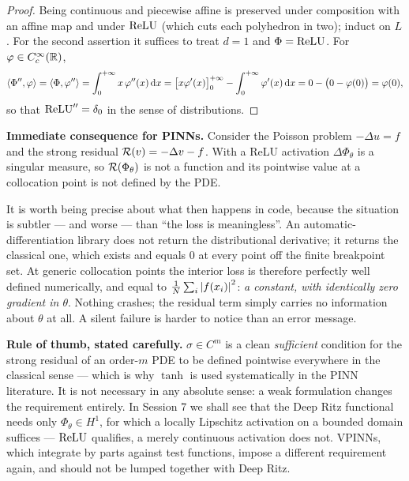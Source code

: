 \documentclass[11pt,a4paper]{article}
\begin{document}
\begin{proof}
Being continuous and piecewise affine is preserved under composition with an affine map and under
$\operatorname{ReLU}$ (which cuts each polyhedron in two); induct on $L$. For the second assertion it suffices to
treat $d = 1$ and $\Phi = \operatorname{ReLU}$. For $\varphi \in C^\infty_c(\mathbb{R})$,
\[
\langle \Phi'' , \varphi \rangle = \langle \Phi , \varphi'' \rangle = \int_0^{+\infty} x\, \varphi''(x)\,\mathrm{d} x
= \big[ x\varphi'(x)\big]_0^{+\infty} - \int_0^{+\infty}\varphi'(x)\,\mathrm{d} x
= 0 - \big(0 - \varphi(0)\big) = \varphi(0),
\]
so that $\operatorname{ReLU}'' = \delta_0$ in the sense of distributions.
\end{proof}

\begin{keybox}
\textbf{Immediate consequence for PINNs.} Consider the Poisson problem $-\Delta u = f$ and the
strong residual $\mathcal{R}(v) = -\Delta v - f$. With a ReLU activation $\Delta \Phi_\theta$ is a singular
measure, so $\mathcal{R}(\Phi_\theta)$ is not a function and its pointwise value at a collocation point is
not defined by the PDE.

\smallskip
It is worth being precise about what then happens in code, because the situation is subtler --- and
worse --- than ``the loss is meaningless''. An automatic-differentiation library does not return the
distributional derivative; it returns the classical one, which exists and equals $0$ at every point
off the finite breakpoint set. At generic collocation points the interior loss is therefore
perfectly well defined numerically, and equal to $\frac1N\sum_i \left\lvert f(x_i) \right\rvert^2$:
\emph{a constant, with identically zero gradient in $\theta$}. Nothing crashes; the residual term
simply carries no information about $\theta$ at all. A silent failure is harder to notice than an
error message.

\smallskip
\textbf{Rule of thumb, stated carefully.} $\sigma \in C^m$ is a clean \emph{sufficient} condition
for the strong residual of an order-$m$ PDE to be defined pointwise everywhere in the classical
sense --- which is why $\tanh$ is used systematically in the PINN literature. It is not necessary in
any absolute sense: a weak formulation changes the requirement entirely. In Session 7 we shall see
that the Deep Ritz functional needs only $\Phi_\theta \in H^1$, for which a locally Lipschitz
activation on a bounded domain suffices --- $\operatorname{ReLU}$ qualifies, a merely continuous activation does
not. VPINNs, which integrate by parts against test functions, impose a different requirement again,
and should not be lumped together with Deep Ritz.
\end{keybox}
\end{document}
